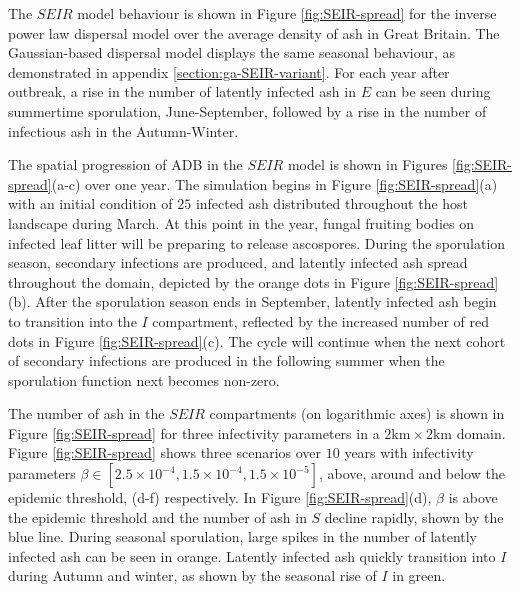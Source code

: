 The $SEIR$ model behaviour is shown in Figure \ref{fig:SEIR-spread} for the inverse power law dispersal model over the average density of ash in Great Britain.
The Gaussian-based dispersal model displays the same seasonal behaviour, as demonstrated in appendix \ref{section:ga-SEIR-variant}. For each year after outbreak, a rise in the number of latently infected ash in $E$ can be seen during summertime sporulation, June-September, followed by a rise in the number of infectious ash in the Autumn-Winter. 

The spatial progression of ADB in the $SEIR$ model is shown in Figures \ref{fig:SEIR-spread}(a-c) over one year. The simulation begins in Figure \ref{fig:SEIR-spread}(a) with an initial condition of $25$ infected ash distributed throughout the host landscape during March. At this point in the year, fungal fruiting bodies on infected leaf litter will be preparing to release ascospores.
During the sporulation season, secondary infections are produced, and latently infected ash spread throughout the domain, depicted by the orange dots in Figure \ref{fig:SEIR-spread}(b). After the sporulation season ends in September, latently infected ash begin to transition into the $I$ compartment, reflected by the increased number of red dots in Figure \ref{fig:SEIR-spread}(c). The cycle will continue when the next cohort of secondary infections are produced in the following summer when the sporulation function next becomes non-zero.

The number of ash in the $SEIR$ compartments (on logarithmic axes) is shown in Figure \ref{fig:SEIR-spread} for three infectivity parameters in a $2\mathrm{km}\times2\mathrm{km}$ domain. Figure \ref{fig:SEIR-spread} shows three scenarios over $10$ years with infectivity parameters $\beta \in [2.5\times 10 ^{-4}, 1.5\times 10 ^{-4}, 1.5\times 10 ^{-5}]$, above, around and below the epidemic threshold, (d-f) respectively. In Figure \ref{fig:SEIR-spread}(d), $\beta$ is above the epidemic threshold and the number of ash in $S$ decline rapidly, shown by the blue line. During seasonal sporulation, large spikes in the number of latently infected ash can be seen in orange. Latently infected ash quickly transition into $I$ during Autumn and winter, as shown by the seasonal rise of $I$ in green.

